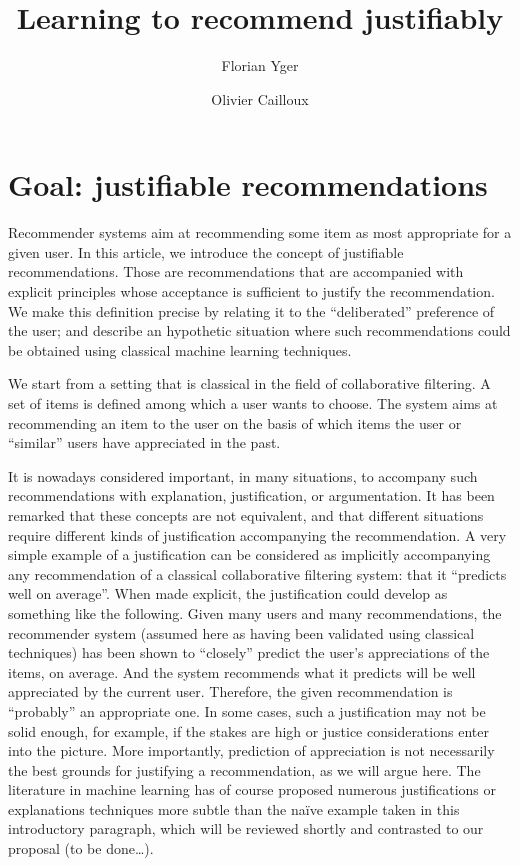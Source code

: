 \documentclass[version=last, pagesize, twoside=off, bibliography=totoc, DIV=calc, fontsize=14pt, a4paper, french, english]{scrartcl}
\begin{document}
\title{%
	Learning to recommend justifiably%
}
\author{Florian Yger}
\author{Olivier Cailloux}
\makeatletter
\makeatother
\maketitle

\section{Goal: justifiable recommendations}
Recommender systems aim at recommending some item as most appropriate for a given user.
In this article, we introduce the concept of justifiable recommendations. Those are recommendations that are accompanied with explicit principles whose acceptance is sufficient to justify the recommendation. We make this definition precise by relating it to the “deliberated” preference of the user; and describe an hypothetic situation where such recommendations could be obtained using classical machine learning techniques.

We start from a setting that is classical in the field of collaborative filtering. A set of items is defined among which a user wants to choose. The system aims at recommending an item to the user on the basis of which items the user or “similar” users have appreciated in the past.

It is nowadays considered important, in many situations, to accompany such recommendations with explanation, justification, or argumentation. It has been remarked that these concepts are not equivalent, and that different situations require different kinds of justification accompanying the recommendation. A very simple example of a justification can be considered as implicitly accompanying any recommendation of a classical collaborative filtering system: that it “predicts well on average”. When made explicit, the justification could develop as something like the following. Given many users and many recommendations, the recommender system (assumed here as having been validated using classical techniques) has been shown to “closely” predict the user’s appreciations of the items, on average. And the system recommends what it predicts will be well appreciated by the current user. Therefore, the given recommendation is “probably” an appropriate one. In some cases, such a justification may not be solid enough, for example, if the stakes are high or justice considerations enter into the picture. More importantly, prediction of appreciation is not necessarily the best grounds for justifying a recommendation, as we will argue here. The literature in machine learning has of course proposed numerous justifications or explanations techniques more subtle than the naïve example taken in this introductory paragraph, which will be reviewed shortly and contrasted to our proposal (to be done…).
\end{document}
